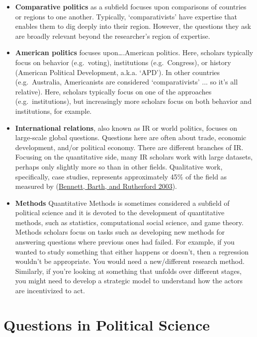\documentclass{book}
\begin{document}
\begin{itemize}
\item
  \textbf{Comparative politics} as a subfield focuses upon comparisons of
  countries or regions to one another. Typically, `comparativists' have
  expertise that enables them to dig deeply into their region. However, the
  questions they ask are broadly relevant beyond the researcher's region of
  expertise.
\item
  \textbf{American politics} focuses upon\ldots.American politics. Here,
  scholars typically focus on behavior (e.g.~voting), institutions
  (e.g.~Congress), or history (American Political Development, a.k.a. `APD').
  In other countries (e.g.~Australia, Americanists are considered
  `comparativists' ... so it's all relative). Here, scholars typically focus
  on one of the approaches (e.g.~institutions), but increasingly more scholars
  focus on both behavior and institutions, for example.
\item
  \textbf{International relations}, also known as IR or world politics,
  focuses on large-scale global questions. Questions here are often about
  trade, economic development, and/or political economy. There are different
  branches of IR. Focusing on the quantitative side, many IR scholars work
  with large datasets, perhaps only slightly more so than in other fields.
  Qualitative work, specifically, case studies, represents approximately 45\%
  of the field as measured by
  (\protect\hyperlink{ref-bennettWePreachWhat2003}{Bennett, Barth, and
  Rutherford 2003}).
\item
  \textbf{Methods} Quantitative Methods is sometimes considered a subfield of
  political science and it is devoted to the development of quantitative
  methods, such as statistics, computational social science, and game theory.
  Methods scholars focus on tasks such as developing new methods for answering
  questions where previous ones had failed. For example, if you wanted to
  study something that either happens or doesn't, then a regression wouldn't
  be appropriate. You would need a new/different research method. Similarly,
  if you're looking at something that unfolds over different stages, you might
  need to develop a strategic model to understand how the actors are
  incentivized to act.
\end{itemize}

\hypertarget{questions-in-political-science}{%
\section{Questions in Political
Science}\label{questions-in-political-science}}
\end{document}
